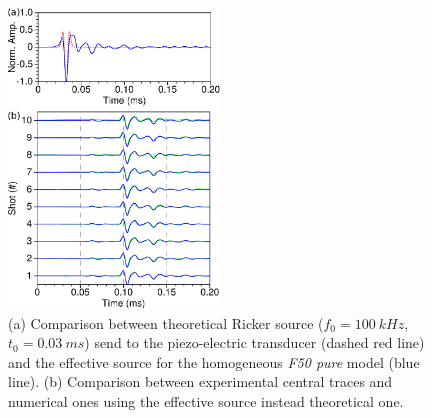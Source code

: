 \documentclass[manuscript,revised]{geophysics}
\begin{document}

\begin{figure}[!h]
	\centering
	\includegraphics[width=0.5\textwidth]{fig/spec_F50_CT_COMP.eps}
	\caption{(a) Comparison between theoretical Ricker source ($f_{0}=100\ kHz$, $t_{0}=0.03\ ms$) send to the piezo-electric transducer (dashed red line) and the effective source for the homogeneous \textit{F50 pure} model (blue line). (b) Comparison between experimental central traces and numerical ones using the effective source instead theoretical one.}
	\label{panel_srcest_2d_mean_comp}
\end{figure}

\end{document}
